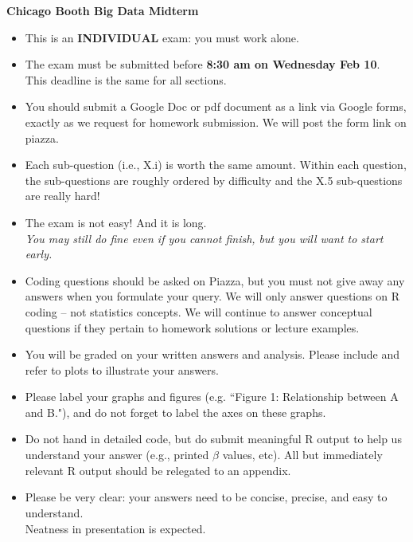 \documentclass[12pt]{article}
\begin{document}
\pagestyle{empty} 


{\bf   \huge {} Chicago Booth Big Data Midterm }

\vskip 2cm
\begin{itemize}
\item {\color{Maroon} This is an {\bf INDIVIDUAL} exam: you must work alone.}
\item {\color{Maroon} The exam must be submitted   before {\bf 8:30 am on Wednesday Feb 10}}. \\ This deadline is the same for all sections.  
\item You should submit a Google Doc or pdf document as a link via Google forms, exactly as we request for homework submission.  We will post the form link on piazza.
\item Each sub-question (i.e., {X.i}) is worth the same amount.  Within each question, the sub-questions are roughly ordered by difficulty and the X.5 sub-questions are really hard!
\item The exam is not easy!   And it is long.  \\{\it You may still do fine even if you cannot finish, but you will want to start early.} 
\item Coding questions should be asked on Piazza, but you must not give away any answers when you formulate your query. We will only answer questions on R coding -- not statistics concepts.  
We will continue to answer conceptual questions if they pertain to homework solutions or lecture examples.
\item You will be graded on your written answers and analysis.  Please include and refer to plots to illustrate your answers.  
\item Please label your graphs and figures (e.g. ``Figure 1: Relationship between A and B."), and do not forget to label the axes on these graphs.
\item Do not hand in detailed code, but do submit meaningful R output to help us understand your answer (e.g., printed $\hat\beta$ values, etc).  { All but immediately relevant R output should be relegated to an appendix.}
\item Please be very clear: your answers need to be concise, precise, and easy to understand. \\ Neatness in presentation is expected.
\end{itemize}


\newpage
{}

\bigskip
\end{document}
